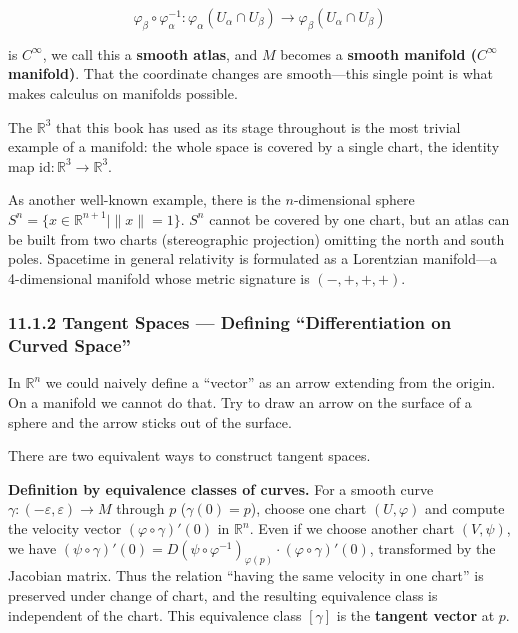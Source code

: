 \documentclass[a4paper,12pt,openany]{book}
\begin{document}
\[\varphi_\beta \circ \varphi_\alpha^{-1}: \varphi_\alpha(U_\alpha \cap U_\beta) \to \varphi_\beta(U_\alpha \cap U_\beta)\]

is \(C^\infty\), we call this a \textbf{smooth atlas}, and \(M\) becomes
a \textbf{smooth manifold (\(C^\infty\) manifold)}. That the coordinate
changes are smooth—this single point is what makes calculus on
manifolds possible.

The \(\mathbb{R}^3\) that this book has used as its stage throughout is
the most trivial example of a manifold: the whole space is covered by a
single chart, the identity map
\(\mathrm{id}: \mathbb{R}^3 \to \mathbb{R}^3\).

As another well-known example, there is the \(n\)-dimensional sphere
\(S^n = \{x \in \mathbb{R}^{n+1} \mid \|x\| = 1\}\). \(S^n\) cannot be
covered by one chart, but an atlas can be built from two charts
(stereographic projection) omitting the north and south poles. Spacetime
in general relativity is formulated as a Lorentzian manifold—a
4-dimensional manifold whose metric signature is \((-,+,+,+)\).

\hypertarget{tangent-spaces-defining-differentiation-on-curved-space}{%
\subsubsection{11.1.2 Tangent Spaces — Defining ``Differentiation on
Curved
Space''}\label{tangent-spaces-defining-differentiation-on-curved-space}}

In \(\mathbb{R}^n\) we could naively define a ``vector'' as an arrow
extending from the origin. On a manifold we cannot do that. Try to draw
an arrow on the surface of a sphere and the arrow sticks out of the
surface.

There are two equivalent ways to construct tangent spaces.

\textbf{Definition by equivalence classes of curves.} For a smooth curve
\(\gamma: (-\varepsilon, \varepsilon) \to M\) through \(p\)
(\(\gamma(0)=p\)), choose one chart \((U, \varphi)\) and compute the
velocity vector \((\varphi \circ \gamma)'(0)\) in \(\mathbb{R}^n\). Even
if we choose another chart \((V, \psi)\), we have
\((\psi \circ \gamma)'(0) = D(\psi \circ \varphi^{-1})_{\varphi(p)} \cdot (\varphi \circ \gamma)'(0)\),
transformed by the Jacobian matrix. Thus the relation ``having the same
velocity in one chart'' is preserved under change of chart, and the
resulting equivalence class is independent of the chart. This
equivalence class \([\gamma]\) is the \textbf{tangent vector} at \(p\).
\end{document}
